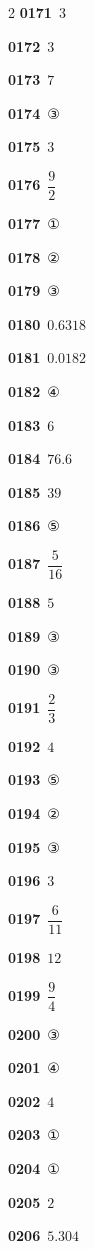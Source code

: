 \documentclass[10pt,a4paper]{article}
\begin{document}
\begin{multicols}{2}
\noindent\textbf{0171}\ $3$\par
\noindent\textbf{0172}\ $3$\par
\noindent\textbf{0173}\ $7$\par
\noindent\textbf{0174}\ ③\par
\noindent\textbf{0175}\ $3$\par
\noindent\textbf{0176}\ $\dfrac{9}{2}$\par
\noindent\textbf{0177}\ ①\par
\noindent\textbf{0178}\ ②\par
\noindent\textbf{0179}\ ③\par
\noindent\textbf{0180}\ $0.6318$\par
\noindent\textbf{0181}\ $0.0182$\par
\noindent\textbf{0182}\ ④\par
\noindent\textbf{0183}\ $6$\par
\noindent\textbf{0184}\ $76.6$\par
\noindent\textbf{0185}\ $39$\par
\noindent\textbf{0186}\ ⑤\par
\noindent\textbf{0187}\ $\dfrac{5}{16}$\par
\noindent\textbf{0188}\ $5$\par
\noindent\textbf{0189}\ ③\par
\noindent\textbf{0190}\ ③\par
\noindent\textbf{0191}\ $\dfrac{2}{3}$\par
\noindent\textbf{0192}\ $4$\par
\noindent\textbf{0193}\ ⑤\par
\noindent\textbf{0194}\ ②\par
\noindent\textbf{0195}\ ③\par
\noindent\textbf{0196}\ $3$\par
\noindent\textbf{0197}\ $\dfrac{6}{11}$\par
\noindent\textbf{0198}\ $12$\par
\noindent\textbf{0199}\ $\dfrac{9}{4}$\par
\noindent\textbf{0200}\ ③\par
\noindent\textbf{0201}\ ④\par
\noindent\textbf{0202}\ $4$\par
\noindent\textbf{0203}\ ①\par
\noindent\textbf{0204}\ ①\par
\noindent\textbf{0205}\ $2$\par
\noindent\textbf{0206}\ $5.304$\par

\end{multicols}
\end{document}
